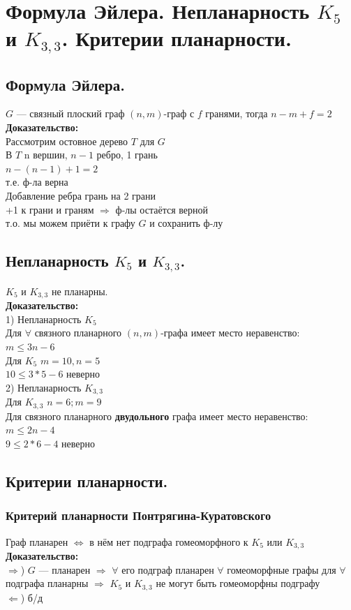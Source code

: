 \documentclass[12pt]{article}
\begin{document}
\section{Формула Эйлера. Непланарность $K_5$ и $K_{3,3}$. Критерии планарности.}
\subsection{Формула Эйлера.}
	$G$ — связный плоский граф $(n,m)$-граф с $f$ гранями, тогда $n - m + f = 2$\\
	\textbf{Доказательство:}\\
		Рассмотрим остовное дерево $T$ для $G$\\
		В $T$ n вершин, $n-1$ ребро, 1 грань\\
		$n - (n - 1) + 1 = 2$\\ т.е. ф-ла верна\\
		Добавление ребра грань на 2 грани\\
		+1 к грани и граням $\Rightarrow$ ф-лы остаётся верной\\
		т.о. мы можем приёти к графу $G$ и сохранить ф-лу\\
	\qedsymbol
\subsection{Непланарность $K_5$ и $K_{3,3}$.}
	$K_5$ и $K_{3,3}$ не планарны.\\
	\textbf{Доказательство:}\\
	1) Непланарность $K_5$\\
	Для $\forall$ связного планарного $(n,m)$-графа имеет место неравенство:\\
	$m \leqslant 3n - 6$\\
	Для $K_5$ $m = 10, n = 5$\\
	$10 \leqslant 3 * 5 - 6$ неверно\\
	2) Непланарность $K_{3,3}$\\
	Для  $K_{3,3}$ $n=6; m=9$\\
	Для связного планарного \textbf{двудольного} графа имеет место неравенство:\\
	$m \leqslant 2n - 4$\\
	$9 \leqslant 2*6 - 4$ неверно\\
	\qedsymbol
\subsection{Критерии планарности.}
\subsubsection{Критерий планарности Понтрягина-Куратовского}
	Граф планарен $\Leftrightarrow$ в нём нет подграфа гомеоморфного к $K_5$ или $K_{3,3}$\\
	\textbf{Доказательство:}\\
		$\Rightarrow$) $G$ — планарен $\Rightarrow$ $\forall$ его подграф планарен $\forall$ гомеоморфные графы для $\forall$ подграфа планарны $\Rightarrow$ $K_{5}$ и $K_{3,3}$ не могут быть гомеоморфны подграфу\\
		$\Leftarrow$) б/д\\
	\qedsymbol
\end{document}
